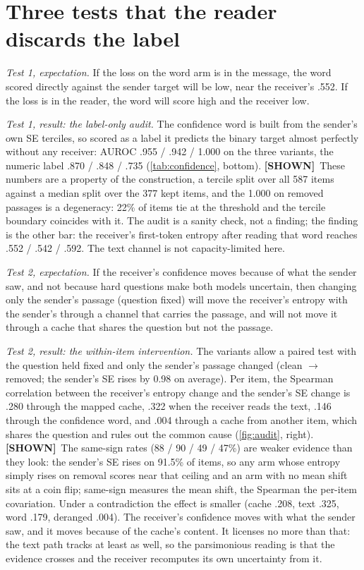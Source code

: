 \documentclass[11pt,a4paper]{report}
\newcommand{\SHOWN}{\textcolor{shownc}{\textbf{\scriptsize[SHOWN]}}}
\begin{document}
\section{Three tests that the reader discards the label}

\emph{Test 1, expectation.} If the loss on the word arm is in the message, the word scored directly against the sender target will be low, near the receiver's .552. If the loss is in the reader, the word will score high and the receiver low.

\emph{Test 1, result: the label-only audit.} The confidence word is built from the sender's own SE terciles, so scored as a label it predicts the binary target almost perfectly without any receiver: AUROC .955 / .942 / 1.000 on the three variants, the numeric label .870 / .848 / .735 (\cref{tab:confidence}, bottom). \SHOWN\ These numbers are a property of the construction, a tercile split over all 587 items against a median split over the 377 kept items, and the 1.000 on removed passages is a degeneracy: 22\% of items tie at the threshold and the tercile boundary coincides with it. The audit is a sanity check, not a finding; the finding is the other bar: the receiver's first-token entropy after reading that word reaches .552 / .542 / .592. The text channel is not capacity-limited here.

\emph{Test 2, expectation.} If the receiver's confidence moves because of what the sender saw, and not because hard questions make both models uncertain, then changing only the sender's passage (question fixed) will move the receiver's entropy with the sender's through a channel that carries the passage, and will not move it through a cache that shares the question but not the passage.

\emph{Test 2, result: the within-item intervention.} The variants allow a paired test with the question held fixed and only the sender's passage changed (clean $\to$ removed; the sender's SE rises by 0.98 on average). Per item, the Spearman correlation between the receiver's entropy change and the sender's SE change is .280 through the mapped cache, .322 when the receiver reads the text, .146 through the confidence word, and .004 through a cache from another item, which shares the question and rules out the common cause (\cref{fig:audit}, right). \SHOWN\ The same-sign rates (88 / 90 / 49 / 47\%) are weaker evidence than they look: the sender's SE rises on 91.5\% of items, so any arm whose entropy simply rises on removal scores near that ceiling and an arm with no mean shift sits at a coin flip; same-sign measures the mean shift, the Spearman the per-item covariation. Under a contradiction the effect is smaller (cache .208, text .325, word .179, deranged .004). The receiver's confidence moves with what the sender saw, and it moves because of the cache's content. It licenses no more than that: the text path tracks at least as well, so the parsimonious reading is that the evidence crosses and the receiver recomputes its own uncertainty from it.
\end{document}
